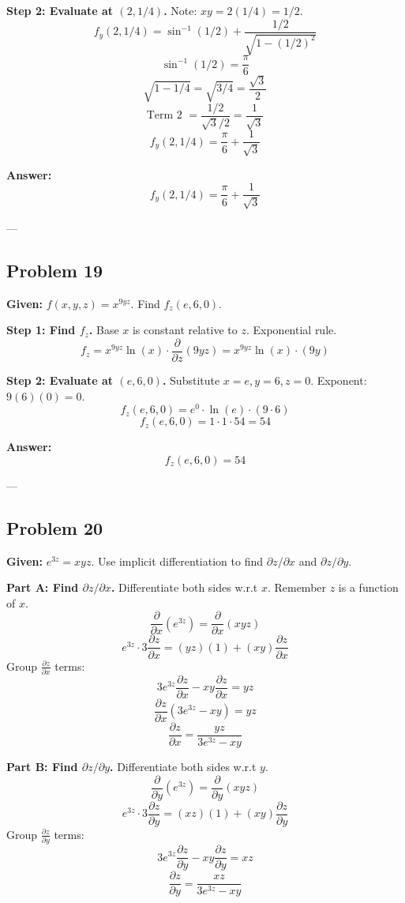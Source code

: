 \documentclass{article}
\begin{document}
\textbf{Step 2: Evaluate at $(2, 1/4)$.}
Note: $xy = 2(1/4) = 1/2$.
\[ f_y(2, 1/4) = \sin^{-1}(1/2) + \frac{1/2}{\sqrt{1 - (1/2)^2}} \]
\[ \sin^{-1}(1/2) = \frac{\pi}{6} \]
\[ \sqrt{1 - 1/4} = \sqrt{3/4} = \frac{\sqrt{3}}{2} \]
\[ \text{Term 2 } = \frac{1/2}{\sqrt{3}/2} = \frac{1}{\sqrt{3}} \]
\[ f_y(2, 1/4) = \frac{\pi}{6} + \frac{1}{\sqrt{3}} \]

\textbf{Answer:}
\[ f_y(2, 1/4) = \frac{\pi}{6} + \frac{1}{\sqrt{3}} \]

---

\subsection*{Problem 19}
\textbf{Given:} $f(x, y, z) = x^{9yz}$. Find $f_z(e, 6, 0)$.

\textbf{Step 1: Find $f_z$.}
Base $x$ is constant relative to $z$. Exponential rule.
\[ f_z = x^{9yz} \ln(x) \cdot \frac{\partial}{\partial z}(9yz) = x^{9yz} \ln(x) \cdot (9y) \]

\textbf{Step 2: Evaluate at $(e, 6, 0)$.}
Substitute $x=e, y=6, z=0$.
Exponent: $9(6)(0) = 0$.
\[ f_z(e, 6, 0) = e^0 \cdot \ln(e) \cdot (9 \cdot 6) \]
\[ f_z(e, 6, 0) = 1 \cdot 1 \cdot 54 = 54 \]

\textbf{Answer:}
\[ f_z(e, 6, 0) = 54 \]

---

\subsection*{Problem 20}
\textbf{Given:} $e^{3z} = xyz$. Use implicit differentiation to find $\partial z / \partial x$ and $\partial z / \partial y$.

\textbf{Part A: Find $\partial z / \partial x$.}
Differentiate both sides w.r.t $x$. Remember $z$ is a function of $x$.
\[ \frac{\partial}{\partial x}(e^{3z}) = \frac{\partial}{\partial x}(xyz) \]
\[ e^{3z} \cdot 3 \frac{\partial z}{\partial x} = (yz)(1) + (xy) \frac{\partial z}{\partial x} \]
Group $\frac{\partial z}{\partial x}$ terms:
\[ 3e^{3z} \frac{\partial z}{\partial x} - xy \frac{\partial z}{\partial x} = yz \]
\[ \frac{\partial z}{\partial x} (3e^{3z} - xy) = yz \]
\[ \frac{\partial z}{\partial x} = \frac{yz}{3e^{3z} - xy} \]

\textbf{Part B: Find $\partial z / \partial y$.}
Differentiate both sides w.r.t $y$.
\[ \frac{\partial}{\partial y}(e^{3z}) = \frac{\partial}{\partial y}(xyz) \]
\[ e^{3z} \cdot 3 \frac{\partial z}{\partial y} = (xz)(1) + (xy) \frac{\partial z}{\partial y} \]
Group $\frac{\partial z}{\partial y}$ terms:
\[ 3e^{3z} \frac{\partial z}{\partial y} - xy \frac{\partial z}{\partial y} = xz \]
\[ \frac{\partial z}{\partial y} = \frac{xz}{3e^{3z} - xy} \]
\end{document}
